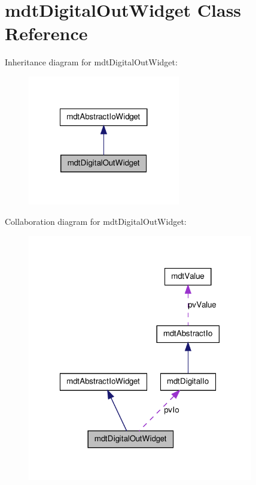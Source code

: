 \hypertarget{classmdt_digital_out_widget}{
\section{mdtDigitalOutWidget Class Reference}
\label{classmdt_digital_out_widget}
}


Inheritance diagram for mdtDigitalOutWidget:\nopagebreak
\begin{figure}[H]
\begin{center}
\leavevmode
\includegraphics[width=188pt]{classmdt_digital_out_widget__inherit__graph}
\end{center}
\end{figure}


Collaboration diagram for mdtDigitalOutWidget:\nopagebreak
\begin{figure}[H]
\begin{center}
\leavevmode
\includegraphics[width=279pt]{classmdt_digital_out_widget__coll__graph}
\end{center}
\end{figure}

